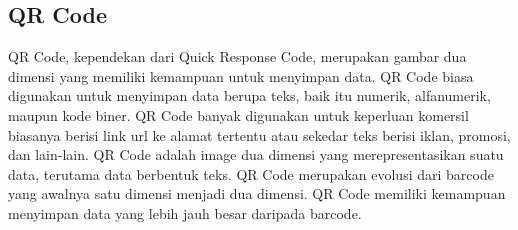 \subsection{QR Code}
QR Code, kependekan dari Quick Response Code, merupakan gambar dua dimensi yang memiliki kemampuan untuk menyimpan data. QR Code biasa digunakan untuk menyimpan data berupa teks, baik itu numerik, alfanumerik, maupun kode biner. QR Code banyak digunakan untuk keperluan komersil biasanya berisi link url ke alamat tertentu atau sekedar teks berisi iklan, promosi, dan lain-lain. QR Code adalah image dua dimensi yang merepresentasikan
suatu data, terutama data berbentuk teks. QR Code merupakan evolusi dari barcode yang awalnya satu dimensi menjadi dua dimensi. QR Code memiliki kemampuan menyimpan data yang
lebih jauh besar daripada barcode.